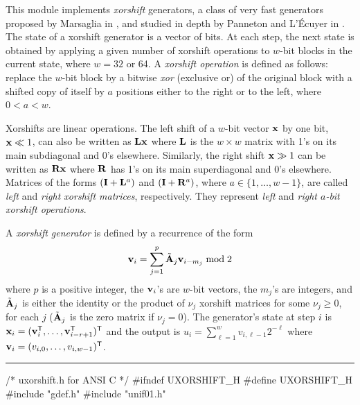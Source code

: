 
\def\OP{\mathop {H}\nolimits}

This module implements \emph{xorshift} generators, a class of very fast
 generators proposed by Marsaglia in \cite{rMAR03a}, and studied
in depth by Panneton and L'\'Ecuyer in  \cite{rPAN04c}.
The state of a xorshift generator is a vector of bits. At each
step, the next state is obtained by applying a given number of
xorshift operations to $w$-bit blocks in the current state, where
$w=32$ or 64. A \emph{xorshift operation} is defined as
follows: replace the $w$-bit block by a bitwise \emph{xor} (exclusive or)
of the original block with a shifted copy of itself by $a$ positions
either to the right or to the left, where $0 < a < w$.

Xorshifts are linear operations.
The left shift of a $w$-bit vector ${\bf x}$ by one bit, ${\bf x} \ll 1$,
can also be written as ${\bf L}{\bf x}$ where ${\bf L}$ is the $w\times w$ matrix
with 1's on its main subdiagonal and 0's elsewhere.
Similarly, the right shift ${\bf x} \gg 1$ can be written as ${\bf R}{\bf x}$
where ${\bf R}$ has 1's on its main superdiagonal and 0's elsewhere.
Matrices of the forms $({\bf I}+{\bf L}^{a})$ and $({\bf I}+{\bf R}^{a})$,
where $a \in \{1,\dots,w-1\}$, are called
\emph{left} and \emph{right xorshift matrices}, respectively.
They represent \emph{left} and \emph{right $a$-bit xorshift operations}.


A \emph{xorshift generator} is defined by a recurrence of the form
\begin{equation}
\label{eq:MRMMprime}
 {\bf v}_i = \sum_{j=1}^p \tilde{{\bf A}}_j {\bf v}_{i-m_j} \bmod 2
\end{equation}
where $p$ is a positive integer, the ${\bf v}_i$'s are $w$-bit vectors,
the $m_j$'s are integers,
and $\tilde{{\bf A}}_j$ is either the identity or the product of
$\nu_j$ xorshift matrices for some $\nu_j\ge 0$,
for each $j$ ($\tilde{{\bf A}}_j$ is the zero matrix if $\nu_j = 0$).
The generator's state at step $i$ is
${\bf x}_i = ({\bf v}_i^{\sf T},\ldots,{\bf v}_{i-r+1}^{\sf T})^{\sf T}$ and
the output is $u_i = \sum_{\ell=1}^w v_{i,\ell-1} 2^{-\ell}$
where ${\bf v}_i = (v_{i,0},\dots,v_{i,w-1})^{\sf T}$.

\bigskip
\hrule
\code
\hide
/*  uxorshift.h  for ANSI C */
#ifndef UXORSHIFT_H
#define UXORSHIFT_H
\endhide
#include "gdef.h"
#include "unif01.h"


